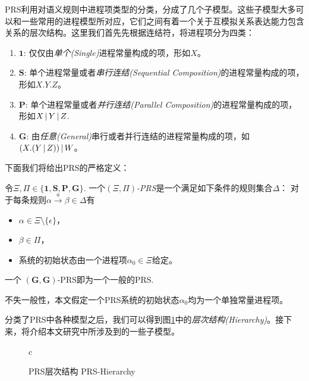 PRS利用对语义规则中进程项类型的分类，分成了几个子模型。这些子模型大多可以和一些常用的进程模型所对应，它们之间有着一个关于互模拟关系表达能力包含关系的层次结构。这里我们首先先根据连结符，将进程项分为四类：
\begin{enumerate}
    \item $\mathbf{1}$: 仅仅由\emph{单个(Single)}进程常量构成的项，形如$X$。
    \item $\mathbf{S}$: 单个进程常量或者\emph{串行连结(Sequential Composition)}的进程常量构成的项，形如$X.Y.Z$。
    \item $\mathbf{P}$: 单个进程常量或者\emph{并行连结(Parallel Composition)}的进程常量构成的项，形如$X\,|\, Y\,|\, Z$.
    \item $\mathbf{G}$: 由\emph{任意(General)}串行或者并行连结的进程常量构成的项，如 $(X.(Y\,|\, Z))\,|\, W$。
\end{enumerate}
下面我们将给出PRS的严格定义：
\begin{defn}\label{def:prs}
令$\Xi,\Pi\in\{\mathbf{1},\mathbf{S},\mathbf{P},\mathbf{G}\}$.
一个\emph{$(\Xi,\Pi)$-PRS}是一个满足如下条件的规则集合$\Delta$：
对于每条规则$\alpha \stackrel{a}{\longrightarrow} \beta\in \Delta$有
\begin{itemize}
	\item $\alpha\in\Xi\setminus \{\epsilon\}$，
	\item $\beta\in\Pi$，
	\item 系统的初始状态由一个进程项$\alpha_0\in\Xi$给定。
\end{itemize}
一个 $(\mathbf{G},\mathbf{G})$-PRS即为一个一般的PRS.
\end{defn}
不失一般性，本文假定一个PRS系统的初始状态$\alpha_0$均为一个单独常量进程项。

分类了PRS中各种模型之后，我们可以得到图\ref{fig:prs}中的\emph{层次结构(Hierarchy)}。接下来，将介绍本文研究中所涉及到的一些子模型。
\begin{figure}
\begin{center}
\begin{tabular}{c}
\end{tabular}
\end{center}
\caption{\textsf{PRS}层次结构 PRS-Hierarchy}
\label{fig:prs}
\end{figure}

